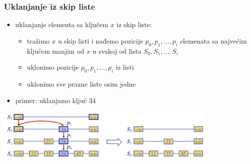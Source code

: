 \documentclass[compress,aspectratio=169]{beamer}
\begin{document}
\begin{frame}[fragile]
  \frametitle{Uklanjanje iz skip liste}
  \begin{itemize}
    \item uklanjanje elementa sa ključem $x$ iz skip liste:
    \begin{itemize}
      \item tražimo $x$ u skip listi i nađemo pozicije $p_0, p_1, \ldots, p_i$ elemenata sa najvećim ključem manjim od $x$ u svakoj od lista $S_0, S_1, \ldots, S_i$
      \item uklonimo pozicije $p_0, p_1, \ldots, p_i$ iz listi
      \item uklonimo sve prazne liste osim jedne
    \end{itemize}
    \item primer: uklanjamo ključ 34 
  \end{itemize}
  \begin{center}
    \includegraphics[width=11cm]{asp-10-pic14.png}
  \end{center}
\end{frame}
\end{document}

